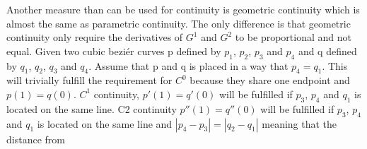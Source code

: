 Another measure than can be used for continuity is geometric continuity which is almost the same as parametric continuity. The only difference is that geometric continuity only require the derivatives of \begin{math}G^1\end{math} and \begin{math}G^2\end{math} to be proportional and not equal. Given two cubic beziér curves p defined by \begin{math}p_1\end{math}, \begin{math}p_2\end{math}, \begin{math}p_3\end{math} and \begin{math}p_4\end{math} and q defined by \begin{math}q_1\end{math}, \begin{math}q_2\end{math}, \begin{math}q_3\end{math} and \begin{math}q_4\end{math}. Assume that p and q is placed in a way that \begin{math}p_4=q_1\end{math}. This will trivially fulfill the requirement for \begin{math}C^0\end{math} because they share one endpoint and \begin{math}p(1)=q(0)\end{math}. \begin{math}C^1\end{math} continuity, \begin{math}p'(1)=q'(0)\end{math} will be fulfilled if \begin{math}p_3\end{math}, \begin{math}p_4\end{math} and \begin{math}q_1\end{math} is located on the same line. C2 continuity \begin{math}p''(1)=q''(0)\end{math} will be fulfilled if  \begin{math}p_3\end{math}, \begin{math}p_4\end{math} and \begin{math}q_1\end{math} is located on the same line and \begin{math}|p_4 - p_3| = |q_2 - q_1|\end{math} meaning that the distance from 